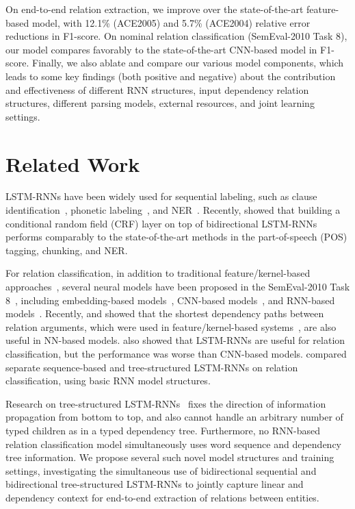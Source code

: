 \documentclass[11pt]{article}
\begin{document}
On end-to-end relation extraction, we improve over the state-of-the-art feature-based model, with 12.1\% (ACE2005) and 5.7\% (ACE2004) relative error reductions in F1-score. 
On nominal relation classification (SemEval-2010 Task 8), our model compares favorably to the state-of-the-art CNN-based model in F1-score. 
Finally, we also ablate and compare our various model components, which leads to some key findings (both positive and negative) about the contribution and effectiveness of different RNN structures, input dependency relation structures, different parsing models, external resources, and joint learning settings.

\section{Related Work}

LSTM-RNNs have been widely used for sequential labeling, such as clause identification~\cite{hammerton2001clause}, phonetic labeling~\cite{graves2005framewise}, 
and NER~\cite{Hammerton:2003:CONLL}.
Recently,  showed that building a conditional
random field (CRF) layer on top of bidirectional LSTM-RNNs performs comparably to the state-of-the-art methods in the part-of-speech (POS) tagging, chunking, and NER.

For relation classification, in addition to traditional feature/kernel-based approaches~\cite{zelenko2003kernel,bunescu2005shortest}, several neural models have been proposed in the SemEval-2010 Task 8~\cite{hendrickx-EtAl:2010:SemEval}, including embedding-based models~\cite{hashimoto-EtAl:2015:CoNLL}, CNN-based models~\cite{dossantos-xiang-zhou:2015:ACL-IJCNLP}, and RNN-based models~\cite{socher-EtAl:2012:EMNLP-CoNLL}.
Recently,  and  showed that the shortest dependency paths between relation arguments, which were used in feature/kernel-based systems~\cite{bunescu2005shortest}, are also useful in NN-based models.
 also showed that LSTM-RNNs are useful for relation
classification, but the performance was worse than CNN-based models.
 compared separate sequence-based and tree-structured LSTM-RNNs on relation classification, using basic RNN model structures. 

Research on tree-structured LSTM-RNNs~\cite{tai-socher-manning:2015:ACL-IJCNLP} fixes the direction of information propagation from bottom to top, and also cannot handle an arbitrary number of typed children as in a typed dependency tree. Furthermore, no RNN-based relation classification model simultaneously uses word sequence and dependency tree information. 
We propose several such novel model structures and training settings, investigating the simultaneous use of bidirectional sequential and bidirectional tree-structured LSTM-RNNs to jointly capture linear and dependency context for end-to-end extraction of relations between entities. 
\end{document}
